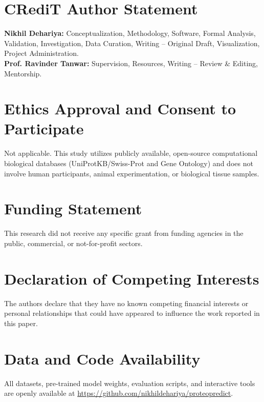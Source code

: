 \section*{CRediT Author Statement}
\textbf{Nikhil Dehariya:} Conceptualization, Methodology, Software, Formal Analysis, Validation, Investigation, Data Curation, Writing -- Original Draft, Visualization, Project Administration. \\
\textbf{Prof. Ravinder Tanwar:} Supervision, Resources, Writing -- Review \& Editing, Mentorship.

\section*{Ethics Approval and Consent to Participate}
Not applicable. This study utilizes publicly available, open-source computational biological databases (UniProtKB/Swiss-Prot and Gene Ontology) and does not involve human participants, animal experimentation, or biological tissue samples.

\section*{Funding Statement}
This research did not receive any specific grant from funding agencies in the public, commercial, or not-for-profit sectors.

\section*{Declaration of Competing Interests}
The authors declare that they have no known competing financial interests or personal relationships that could have appeared to influence the work reported in this paper.

\section*{Data and Code Availability}
All datasets, pre-trained model weights, evaluation scripts, and interactive tools are openly available at \url{https://github.com/nikhildehariya/proteopredict}.
